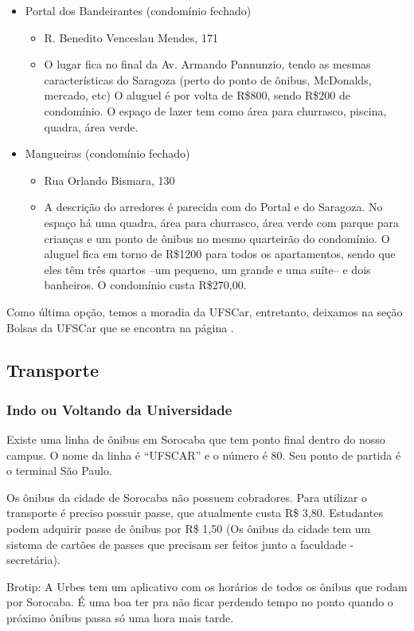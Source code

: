 \begin{itemize}
  \item Portal dos Bandeirantes (condomínio fechado)
    \begin{itemize}
      \item R. Benedito Venceslau Mendes, 171
      \item O lugar fica no final da Av. Armando Pannunzio, tendo as mesmas características do Saragoza (perto do ponto de ônibus, McDonalds, mercado, etc) O aluguel é por volta de R\$800, sendo R\$200 de condomínio. O espaço de lazer tem como área para churrasco, piscina, quadra, área verde.
    \end{itemize}
  \item Mangueiras (condomínio fechado)
    \begin{itemize}
      \item Rua Orlando Bismara, 130
      \item A descrição do arredores é parecida com do Portal e do Saragoza. No espaço há uma quadra, área para churrasco, área verde com parque para crianças e um ponto de ônibus no mesmo quarteirão do condomínio. O aluguel fica em torno de R\$1200 para todos os apartamentos, sendo que eles têm três quartos --um pequeno, um grande e uma suíte-- e dois banheiros. O condomínio custa R\$270,00.
    \end{itemize}
\end{itemize}

Como última opção, temos a moradia da UFSCar, entretanto,  deixamos na seção Bolsas da UFSCar que se encontra na página \pageref{moradia}.

\subsection{Transporte}
\subsubsection{Indo ou Voltando da Universidade}
Existe uma linha de ônibus em Sorocaba que tem ponto final dentro do nosso campus. O nome da linha é “UFSCAR” e o número é 80. Seu ponto de partida é o terminal São Paulo. 

Os ônibus da cidade de Sorocaba não possuem cobradores. Para utilizar o transporte é preciso possuir passe, que atualmente custa R\$ 3,80. Estudantes podem adquirir passe de ônibus por R\$ 1,50 (Os ônibus da cidade tem um sistema de cartões de passes que precisam ser feitos junto a faculdade - secretária).

Brotip: A Urbes tem um aplicativo com os horários de todos os ônibus que rodam por Sorocaba. É uma boa ter pra não ficar perdendo tempo no ponto quando o próximo ônibus passa só uma hora mais tarde. 


